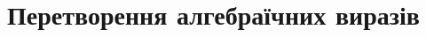 \documentclass{book}
\begin{document}
\chapter{Перетворення алгебраїчних виразів}


\begin{comment}




\chapter{Перетворення виразів з показниками і логарифмами}






\end{comment}
\end{document}
